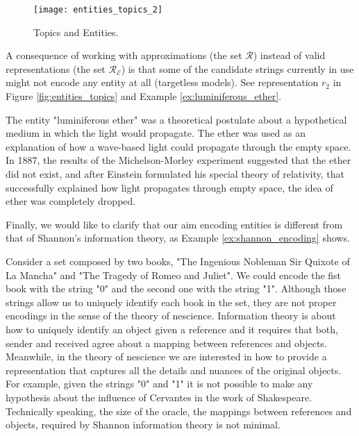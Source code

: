 \begin{figure}[h]
\centering\texttt{[image: entities\_topics\_2]}
\caption{\label{fig:new_topics}Topics and Entities.}
\end{figure}

A consequence of working with approximations (the set $\mathcal{R}$) instead of valid representations (the set $\mathcal{R}_\mathcal{E}$) is that some of the candidate strings currently in use might not encode any entity at all (targetless models). See representation $r_2$ in Figure \ref{fig:entities_topics} and Example \ref{ex:luminiferous_ether}.

\begin{example}
\label{ex:luminiferous_ether}
The entity "luminiferous ether" was a theoretical postulate about a hypothetical medium in which the light would propagate. The ether was used as an explanation of how a wave-based light could propagate through the empty space. In 1887, the results of the Michelson-Morley experiment suggested that the ether did not exist, and after Einstein formulated his special theory of relativity, that successfully explained how light propagates through empty space, the idea of ether was completely dropped.
\end{example}

Finally, we would like to clarify that our aim encoding entities is different from that of Shannon's information theory, as Example \ref{ex:shannon_encoding} shows.

\begin{example}
\label{ex:shannon_encoding}
Consider a set composed by two books, "The Ingenious Nobleman Sir Quixote of La Mancha" and "The Tragedy of Romeo and Juliet". We could encode the fist book with the string "0" and the second one with the string "1". Although those strings allow us to uniquely identify each book in the set, they are not proper encodings in the sense of the theory of nescience. Information theory is about how to uniquely identify an object given a reference and it requires that both, sender and received agree about a mapping between references and objects. Meanwhile, in the theory of nescience we are interested in how to provide a representation that captures all the details and nuances of the original objects. For example, given the strings "0" and "1" it is not possible to make any hypothesis about the influence of Cervantes in the work of Shakespeare. Technically speaking, the size of the oracle, the mappings between references and objects, required by Shannon information theory is not minimal.
\end{example}


